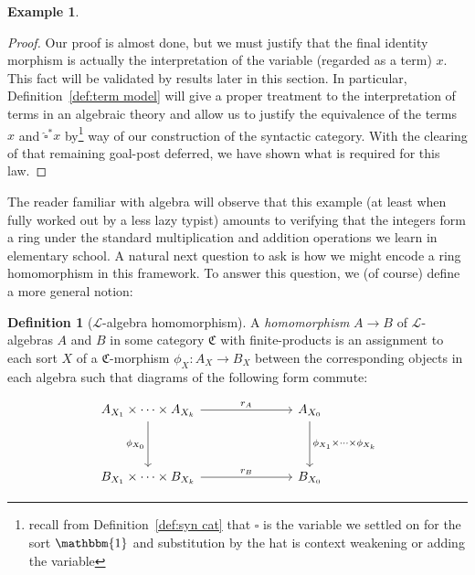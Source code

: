 \documentclass[12pt,twoside]{reedthesis}
\theoremstyle{definition}
\newtheorem{definition}{Definition}
\newtheorem{example}{Example}
\theoremstyle{remark}
\theoremstyle{plain}
\begin{document}
\begin{example}
\begin{enumerate}
\begin{proof}
            Our proof is almost done, but we must justify that the final
            identity morphism is actually the interpretation of the variable
            (regarded as a term) $x$. This fact will be validated by results
            later in this section. In particular, Definition~\ref{def:term
              model} will give a proper treatment to the interpretation of terms
            in an algebraic theory and allow us to justify the equivalence of
            the terms $x$ and $\hat{\square}^{*} x$ by\footnote{recall from
              Definition~\ref{def:syn cat} that $\square$ is the variable we settled
              on for the sort $\mathbbm{1}$ and substitution by the hat is
              context weakening or adding the variable} way of our construction
            of the syntactic category. With the clearing of that remaining
            goal-post deferred, we have shown what is required for this law.
          \end{proof}
  \end{enumerate}
\end{example}

The reader familiar with algebra will observe that this example (at least when
fully worked out by a less lazy typist) amounts to verifying that the integers
form a ring under the standard multiplication and addition operations we learn
in elementary school. A natural next question to ask is how we might encode a
ring homomorphism in this framework. To answer this question, we (of course)
define a more general notion:

\begin{definition}[$\mathcal{L}$-algebra homomorphism]\label{def:homomorphism}
  A \emph{homomorphism} \( A \rightarrow B\) of $\mathcal{L}$-algebras $A$ and $B$ in some
  category $\mathfrak{C}$ with finite-products is an assignment to each sort $X$
  of a $\mathfrak{C}$-morphism \( \phi_{X} : A_{X} \rightarrow B_{X}\) between the
  corresponding objects in each algebra such that diagrams of the following form
  commute:

  \[\begin{tikzcd}
      {A_{X_1}\times\cdots \times A_{X_k}} &&& {A_{X_0}} \\
      \\
      {B_{X_1}\times\cdots\times B_{X_k}} &&& {B_{X_0}}
      \arrow["{r_A}", from=1-1, to=1-4]
      \arrow["{r_B}", from=3-1, to=3-4]
      \arrow["{\phi_{X_0}}"', from=1-1, to=3-1]
      \arrow["{\phi_{X_1}\times \cdots \times \phi_{X_k}}", from=1-4, to=3-4]
    \end{tikzcd}\]

\end{definition}
\end{document}
